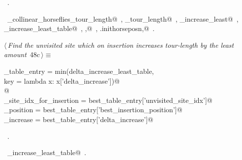 \documentclass[11.5pt]{report}
\begin{document}
\begin{flushleft}
\begin{list}{}{}
\mbox{}\verb@                                   'delta_increase'          : delta_increase_least})@\\
\mbox{}\verb@@{\NWsep}
\end{list}
\vspace{-1.5ex}
\footnotesize
\begin{list}{}{\setlength{\itemsep}{-\parsep}\setlength{\itemindent}{-\leftmargin}}
\item \NWtxtMacroRefIn\ .
\item \NWtxtIdentsUsed\nobreak\  \verb@compute_collinear_horseflies_tour_length@\nobreak\ , \verb@current_tour_length@\nobreak\ , \verb@delta_increase_least@\nobreak\ , \verb@delta_increase_least_table@\nobreak\ , \verb@ibest,@\nobreak\ , \verb@self.inithorseposn,@\nobreak\ .
\item{}
\end{list}
\vspace{4ex}
\end{flushleft}


\vspace{-0.8cm}\newchunk 

\begin{flushleft} \small\label{scrap72}\raggedright\small
{} $\langle\,${\itshape Find the unvisited site which on insertion increases tour-length by the least amount}\nobreak\ {\footnotesize {48c}}$\,\rangle\equiv$
\vspace{-1ex}
\begin{list}{}{} \item
\mbox{}\verb@best_table_entry = min(delta_increase_least_table, \@\\
\mbox{}\verb@                         key = lambda x: x['delta_increase'])@\\
\mbox{}\verb@         @\\
\mbox{}\verb@unvisited_site_idx_for_insertion = best_table_entry['unvisited_site_idx']@\\
\mbox{}\verb@insertion_position               = best_table_entry['best_insertion_position']@\\
\mbox{}\verb@delta_increase                   = best_table_entry['delta_increase']@\\
\mbox{}\verb@@{\NWsep}
\end{list}
\vspace{-1.5ex}
\footnotesize
\begin{list}{}{\setlength{\itemsep}{-\parsep}\setlength{\itemindent}{-\leftmargin}}
\item \NWtxtMacroRefIn\ .
\item \NWtxtIdentsUsed\nobreak\  \verb@delta_increase_least_table@\nobreak\ .
\item{}
\end{list}
\vspace{4ex}
\end{flushleft}
\end{document}

